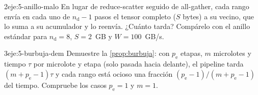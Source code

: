 \begin{ejercicio}{2}{eje:5-anillo-malo}
En lugar de reduce-scatter seguido de all-gather, cada rango envía en cada uno de $n_{\mathrm{d}}-1$ pasos el tensor completo ($S$ bytes) a su vecino, que lo suma a su acumulador y lo reenvía. ¿Cuánto tarda? Compárelo con el anillo estándar para $n_{\mathrm{d}}=8$, $S=2$~GB y $W=100$~GB/s.
\end{ejercicio}

\begin{ejercicio}{3}{eje:5-burbuja-dem}
Demuestre la \cref{prop:burbuja}: con $p_{\mathrm{e}}$ etapas, $m$ microlotes y tiempo $\tau$ por microlote y etapa (solo pasada hacia delante), el pipeline tarda $(m+p_{\mathrm{e}}-1)\tau$ y cada rango está ocioso una fracción $(p_{\mathrm{e}}-1)/(m+p_{\mathrm{e}}-1)$ del tiempo. Compruebe los casos $p_{\mathrm{e}}=1$ y $m=1$.
\end{ejercicio}
